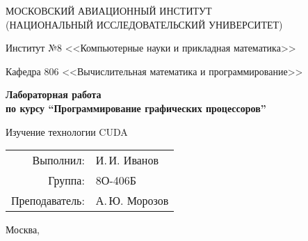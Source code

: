 \begin{titlepage}
\begin{center}
\large
МОСКОВСКИЙ АВИАЦИОННЫЙ ИНСТИТУТ\\ (НАЦИОНАЛЬНЫЙ ИССЛЕДОВАТЕЛЬСКИЙ УНИВЕРСИТЕТ)

\vspace{20pt}

Институт №8 <<Компьютерные науки и прикладная математика>>

Кафедра 806 <<Вычислительная математика и программирование>>
\end{center}

\vspace{60pt}

\begin{center}
\bfseries
\large
Лабораторная работа  \\по курсу \enquote{Программирование графических процессоров}

\vspace{54pt}

Изучение технологии CUDA
\end{center}

\vfill

\begin{flushright}
\large
\begin{tabular}{rl}
Выполнил: & И.\,И. Иванов \\
Группа: & 8О-406Б \\
Преподаватель: & А.\,Ю. Морозов \\
\end{tabular}
\end{flushright}

\vspace{92pt}

\begin{center}
\large
Москва, \the\year
\end{center}
\end{titlepage}

\pagebreak
